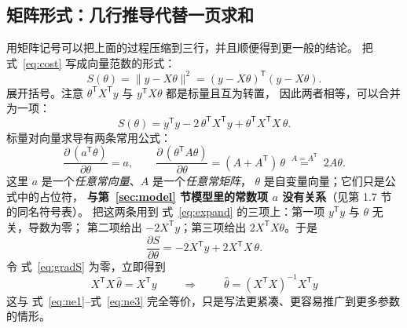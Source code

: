 \documentclass[cn,blue,11pt,device=normal]{elegantnote}
\newcommand{\fref}[1]{式~\eqref{#1}}
\begin{document}
\subsection{矩阵形式：几行推导代替一页求和}

用矩阵记号可以把上面的过程压缩到三行，并且顺便得到更一般的结论。
把 \fref{eq:cost} 写成向量范数的形式：
\begin{equation}\label{eq:costmat}
  S(\theta) = \lVert y - X\theta\rVert^2 = (y-X\theta)^{\mathsf T}(y-X\theta).
\end{equation}
展开括号。注意 $\theta^{\mathsf T}X^{\mathsf T}y$ 与 $y^{\mathsf T}X\theta$ 都是标量且互为转置，
因此两者相等，可以合并为一项：
\begin{equation}\label{eq:expand}
  S(\theta) = y^{\mathsf T}y - 2\,\theta^{\mathsf T}X^{\mathsf T}y + \theta^{\mathsf T}X^{\mathsf T}X\,\theta .
\end{equation}
标量对向量求导有两条常用公式：
\begin{equation}\label{eq:matrixderiv}
  \frac{\partial\,(a^{\mathsf T}\theta)}{\partial\theta} = a,
  \qquad
  \frac{\partial\,(\theta^{\mathsf T}A\theta)}{\partial\theta} = (A+A^{\mathsf T})\,\theta
  \;\overset{A=A^{\mathsf T}}{=}\; 2A\theta .
\end{equation}
这里 $a$ 是一个\emph{任意常向量}、$A$ 是一个\emph{任意常矩阵}，
$\theta$ 是自变量向量；它们只是公式中的占位符，
\textbf{与第~\ref{sec:model} 节模型里的常数项 $a$ 没有关系}（见第 1.7 节的同名符号表）。
把这两条用到 \fref{eq:expand} 的三项上：第一项 $y^{\mathsf T}y$ 与 $\theta$ 无关，导数为零；
第二项给出 $-2X^{\mathsf T}y$；第三项给出 $2X^{\mathsf T}X\theta$。于是
\begin{equation}\label{eq:gradS}
  \frac{\partial S}{\partial\theta}
  = -2X^{\mathsf T}y + 2X^{\mathsf T}X\,\theta .
\end{equation}
令 \fref{eq:gradS} 为零，立即得到
\begin{equation}\label{eq:normal}
  \boxed{\;X^{\mathsf T}X\,\hat\theta = X^{\mathsf T}y\;}
  \qquad\Longrightarrow\qquad
  \boxed{\;\hat\theta = (X^{\mathsf T}X)^{-1}X^{\mathsf T}y\;}
\end{equation}
这与 \fref{eq:ne1}--\fref{eq:ne3} 完全等价，只是写法更紧凑、更容易推广到更多参数的情形。
\end{document}
